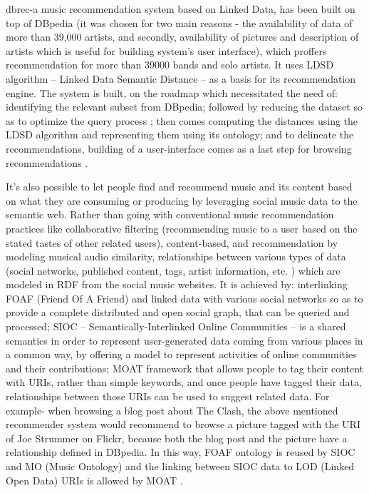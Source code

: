 \documentclass{proc}
\begin{document}
dbrec-a music recommendation system based on Linked Data, has been built on top of DBpedia (it was chosen for two main reasons - the availability of data of more than 39,000 artists, and secondly, availability of pictures and description of artists which is useful for building system’s user interface), which proffers recommendation for more than 39000 bands and solo artists. It uses LDSD algorithm – Linked Data Semantic Distance – as a basis for its recommendation engine. The system is built, on the roadmap which necessitated the need of: identifying the relevant subset from DBpedia; followed by reducing the dataset so as to optimize the query process ; then comes computing the distances using the LDSD algorithm and representing them using its ontology; and to delineate the recommendations, building of a user-interface comes as a last step for browsing recommendations \cite{Passant2007}. 


It’s also possible to let people find and recommend music and its content based on what they are consuming or producing by leveraging social music data to the semantic web. Rather than going with conventional music recommendation practices like collaborative filtering (recommending music to a user based on the stated tastes of other related users), content-based, and recommendation by modeling musical audio similarity, relationships between various types of data (social networks, published content, tags, artist information, etc. ) which are modeled in RDF from the social music websites. It is achieved by: interlinking FOAF (Friend Of A Friend) and linked data with various social networks so as to provide a complete distributed and open social graph, that can be queried and processed; SIOC – Semantically-Interlinked Online Communities – is a shared semantics in order to represent user-generated data coming from various places in a common way, by offering a model to represent activities of online communities and their contributions; MOAT framework that allows people to tag their content with URIs, rather than simple keywords, and once people have tagged their data, relationships between those URIs can be used to suggest related data. For example- when browsing a blog post about The Clash, the above mentioned recommender system would recommend to browse a picture tagged with the URI of Joe Strummer on Flickr, because both the blog post and the picture have a relationship defined in DBpedia. In this way, FOAF ontology is reused by SIOC and MO (Music Ontology) and the linking between SIOC data to LOD (Linked Open Data) URIs is allowed by MOAT \cite{Passant}. 
\end{document}
